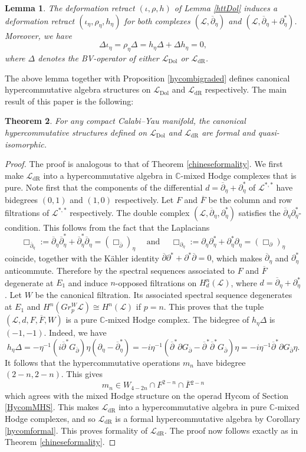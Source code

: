 \documentclass[a4paper]{amsart}
\newtheorem{theo}{Theorem}[section]
\newtheorem{lemm}[theo]{Lemma}
\theoremstyle{definition}
\theoremstyle{theorem}
\newcommand{\CC}{\mathbb{C}}
\newcommand{\Ll}{\mathcal{L}}
\newcommand{\ov}{\overline}
\newcommand{\del}{\partial}
\newcommand{\delb}{{\overline\partial}}
\newcommand{\Hycom}{{\mathrm{Hycom}}}
\newcommand{\Dol}{\mathrm{Dol}}
\newcommand{\dR}{\mathrm{dR}}
\begin{document}
\begin{lemm}\label{httBK}The deformation retract $(\iota,\rho,h)$ of Lemma \ref{httDol} induces a deformation retract
$(\iota_\eta,\rho_\eta,h_\eta)$ for both complexes $(\Ll,\delb_\eta)$ and $(\Ll,\delb_\eta+\del^*_\eta)$.
Moreover, we have \[
\Delta \iota_\eta=\rho_\eta \Delta=h_\eta\Delta+\Delta h_\eta=0,\] where 
$\Delta$ denotes the BV-operator of either $\Ll_{\Dol}$ or $\Ll_{\dR}$.
\end{lemm}


The above lemma together with Proposition \ref{hycombigraded} defines canonical hypercommutative algebra structures on 
$\Ll_{\Dol}$ and $\Ll_{\dR}$ respectively. The main result of this paper is the following:


\begin{theo}\label{mainthm}
For any compact Calabi--Yau manifold, the canonical hypercommutative structures defined on $\Ll_{\Dol}$ and $\Ll_{\dR}$ are formal and quasi-isomorphic.
\end{theo}
\begin{proof}
The proof is analogous to that of Theorem \ref{chineseformality}.
We first make $\Ll_{\dR}$ into a hypercommutative algebra in $\CC$-mixed Hodge complexes that is pure.
Note first that the components of the differential $d=\delb_\eta+\del^*_\eta$ of $\Ll^{*,*}$ have bidegrees $(0,1)$ and $(1,0)$ respectively.
Let $F$ and $\ov{F}$ be the column and row filtrations of $\Ll^{*,*}$ respectively.
The double complex $(\Ll,\delb_\eta,\del^*_\eta)$ satisfies the $\delb_\eta\del^*_\eta$-condition.
This follows from the fact that the Laplacians 
\[\Box_{\delb_\eta}:=\delb_\eta\delb_\eta^*+\delb_\eta^*\delb_\eta=(\Box_\delb)_\eta\quad\text{ and }\quad
 \Box_{\del_\eta}:=\del_\eta\del_\eta^*+\del_\eta^*\del_\eta=(\Box_\del)_\eta
\]
coincide, together with
the Kähler identity
$\delb\del^*+\del^*\delb=0$, which makes $\delb_\eta$ and $\del^*_\eta$ anticommute.
Therefore by \cite[Proposition 5.17]{DGMS} the spectral sequences associated to $F$ and $\ov{F}$ degenerate at $E_1$ and 
induce $n$-opposed filtrations on $H^n_d(\Ll)$, where $d=\delb_\eta+\del^*_\eta$.
Let $W$ be the canonical filtration. 
Its associated spectral sequence degenerates at $E_1$ and $H^n(Gr_p^W\Ll)\cong H^n(\Ll)$ if $p=n$. 
This proves that the tuple $(\Ll,d,F,\ov{F},W)$ is a pure $\CC$-mixed Hodge complex.
The bidegree of $h_\eta \Delta$ is $(-1,-1)$. Indeed, we have 
\[h_\eta\Delta=-\eta^{-1}(i\delb^* G_\delb)\eta (\del_\eta-\delb^*_\eta)=
-i \eta^{-1} (\delb^*\del G_\delb -\delb^*\delb^* G_\delb)\eta
=-i \eta^{-1} \delb^*\del G_\delb \eta.\]
It follows that the hypercommutative operations $m_n$ have bidegree $(2-n,2-n)$. 
This gives \[m_n\in W_{4-2n}\cap F^{2-n}\cap \ov{F}{}^{2-n}\]
which agrees with the mixed Hodge structure on the operad $\Hycom$ of Section \ref{HycomMHS}. This makes $\Ll_{\dR}$ into a hypercommutative algebra in pure $\CC$-mixed Hodge complexes, and so $\Ll_{\dR}$ is a formal hypercommutative algebra by Corollary 
\ref{hycomformal}.
This proves formality of $\Ll_{\dR}$.
The proof now follows exactly as in Theorem \ref{chineseformality}.
\end{proof}
\end{document}
